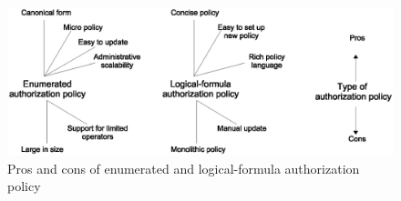 
 	\begin{figure} 
 		\centering
 		\includegraphics[width=.9\textwidth]{DBSEC16/policy-pros-cons}
 		\caption{Pros and cons of enumerated and logical-formula authorization policy}
 		\label{fig:policy-pros-cons}
 	\end{figure}